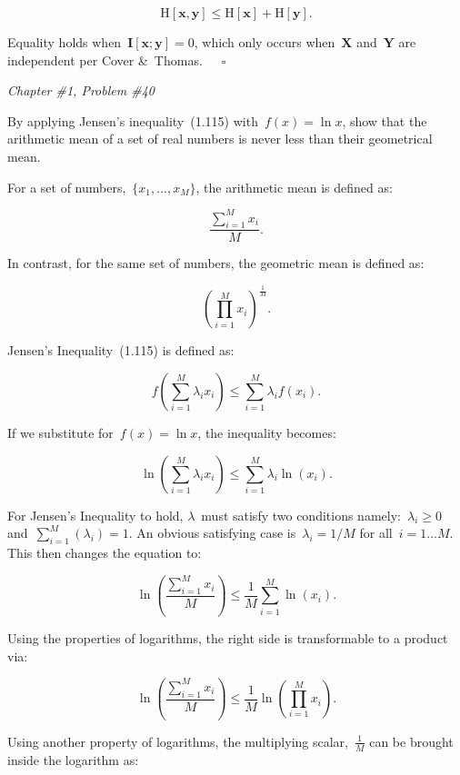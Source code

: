 \documentclass{report}
\newcounter{subProbCount}       %
\newenvironment{problemshell}{
  \par%
  \medskip
  \leftskip=0pt\rightskip=0pt%
}
{
  \par\medskip
  \setcounter{subProbCount}{1} %
}
\newenvironment{problem}[2]
{%
  \begin{problemshell}
    \noindent \textit{Chapter \##1, Problem \##2} \\
    \bfseries  
}
{
  \end{problemshell}
}
\begin{document}
  \begin{equation}
    \textrm{H}[\mathbf{x},\mathbf{y}] \leq \textrm{H}[\mathbf{x}] + \textrm{H}[\mathbf{y}] \textrm{.}
  \end{equation}
  
  Equality holds when~$\mathbf{I}[\mathbf{x};\mathbf{y}]=0$, which only occurs when~$\mathbf{X}$ and~$\mathbf{Y}$ are independent per Cover \&~Thomas.~~~$\square$
  
  \newpage
  \begin{problem}{1}{40}
     By applying Jensen's inequality~(1.115) with~$f(x)=\ln x$, show that the arithmetic mean of a set of real numbers is never less than their geometrical mean.
  \end{problem}
  
  For a set of numbers,~$\{x_1,...,x_M\}$, the arithmetic mean is defined as:
  
  \[ \frac{\sum_{i=1}^{M}x_i}{M} \textrm{.} \]
  
  In contrast, for the same set of numbers, the geometric mean is defined as:
  
  \[ \left( \prod_{i=1}^{M}x_i \right)^\frac{1}{M}\textrm{.} \]
  
  Jensen's Inequality~(1.115) is defined as:
  
  \[ f \left( \sum_{i=1}^M{\lambda_{i} x_i} \right) \leq \sum_{i=1}^M{\lambda_{i} f(x_i)}\textrm{.}\]
  
  If we substitute for~$f(x)=\ln x$, the inequality becomes:

  \[ \ln \left( \sum_{i=1}^M{\lambda_{i} x_i} \right) \leq \sum_{i=1}^M{\lambda_{i} \ln(x_i)}\textrm{.} \]
  
  For Jensen's Inequality to hold, $\lambda$~must satisfy two conditions namely:~$\lambda_i \geq 0$ and~$\sum_{i=1}^{M}\left( \lambda_i \right) = 1$.  An obvious satisfying case is~$\lambda_i=1/M$ for all~$i=1...M$.  This then changes the equation to:
  
  \[ \ln \left( \frac{\sum_{i=1}^{M}{x_i}}{M} \right) \leq \frac{1}{M}\sum_{i=1}^M{\ln(x_i)}\textrm{.} \]
  
  Using the properties of logarithms, the right side is transformable to a product via:
  
  \[ \ln \left( \frac{\sum_{i=1}^{M}{x_i}}{M} \right) \leq \frac{1}{M}{\ln \left( \prod_{i=1}^M{x_i} \right)}\textrm{.} \]
  
  Using another property of logarithms, the multiplying scalar,~$\frac{1}{M}$ can be brought inside the logarithm as:
  
\end{document}
